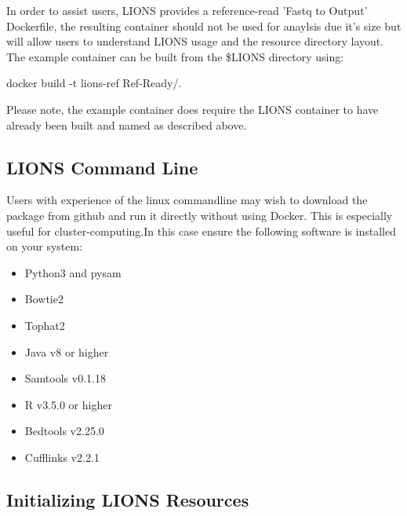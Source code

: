 \documentclass[11pt]{scrartcl}
\begin{document}
In order to assist users, LIONS provides a reference-read 'Fastq to Output' Dockerfile, the resulting container should not be used for anaylsis due it's size but will allow users to understand LIONS usage and the resource directory layout. 
The example container can be built from the \$LIONS directory using:

\begin{bash}
docker build -t lions-ref Ref-Ready/.
\end{bash}
Please note, the example container does require the LIONS container to have already been built and named as described above.

\vspace{2em}
\subsection{LIONS Command Line}

Users with experience of the linux commandline may wish to download the package from github and run it directly without using Docker. This is especially useful for cluster-computing.In this case ensure the following software is installed on your system: 

\begin{itemize}
\item Python3 and pysam
\item Bowtie2
\item Tophat2
\item Java v8 or higher
\item Samtools v0.1.18
\item R v3.5.0 or higher
\item Bedtools v2.25.0
\item Cufflinks v2.2.1
\end{itemize}

\subsection{Initializing LIONS Resources}
\end{document}
